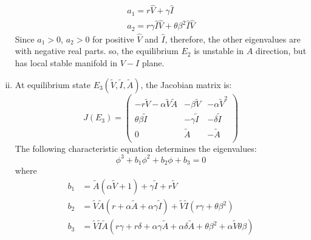 \documentclass[12pt]{article}
\numberwithin{equation}{section}
\begin{document}
\begin{enumerate}[i).]
\begin{align}
a_1=r\hat V+\gamma \hat I\\
a_2=r\gamma \hat I \hat V+\theta \beta^2 \hat I \hat V
\end{align}
Since $a_1>0$, $a_2>0$ for positive $\hat V$ and $\hat I$, therefore, the other eigenvalues are with negative real parts. so, the equilibrium $E_2$ is unstable in $A$ direction, but has local stable manifold in $V-I$ plane.
\item At equilibrium state $E_3(\tilde V, \tilde I, \tilde A)$, the Jacobian matrix is:
\begin{equation}\label{sec3:e33}
J(E_3)=
\left({\begin{matrix}
	-r\tilde V-\alpha \tilde V \tilde A  & -\beta \tilde V & -\alpha \tilde V^2\\
	\theta \beta \tilde I & -\gamma \tilde I & -\delta \tilde I\\
	0 & \tilde A & -\tilde A\\
\end{matrix}}\right)
\end{equation}
The following characteristic equation determines the eigenvalues:
\begin{equation}\label{sec3:e34}
\phi^3+b_1\phi^2+b_2\phi+b_3=0
\end{equation}
where\\
\begin{align}\label{sec3:e34}
b_1&= \tilde A (\alpha \tilde V + 1) + \gamma \tilde I + r\tilde V\\
b_2&= \tilde V \tilde A (r + \alpha \tilde A + \alpha \gamma \tilde I) + \tilde V \tilde I(r\gamma + \theta \beta^2)\\
b_3 &=\tilde V \tilde I \tilde A (r\gamma + r\delta + \alpha \gamma \tilde A + \alpha \delta \tilde A + \theta \beta^2 + \alpha \tilde V \theta \beta)
\end{align}

\end{enumerate}
\end{document}
